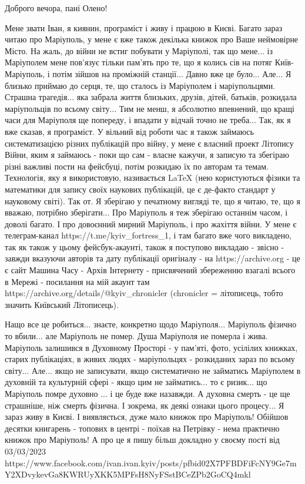  
 
 
 
 

Доброго вечора, пані Олено!

Мене звати Іван, я киянин, програміст і живу і працюю в Києві. Багато зараз
читаю про Маріуполь, у мене є вже також декілька книжок про Ваше неймовірне
Місто. На жаль, до війни не встиг побувати у Маріуполі, так що мене...  із
Маріуполем мене пов'язує тільки пам'ять про те, що я колись сів на потяг
Київ-Маріуполь, і потім зійшов на проміжній станції... Давно вже це було...
Але... Я близько приймаю до серця, те, що сталось із Маріуполем і
маріупольцями. Страшна трагедія... яка забрала життя близьких, друзів, дітей,
батьків, розкидала маріупольців по всьому світу...  Тим не менш, я абсолютно
впевнений, що кращі часи для Маріуполя ще попереду, і впадати у відчай точно не
треба...  Так, як я вже сказав, я програміст. У вільний від роботи час я також
займаюсь систематизацією різних публікацій про війну, у мене є власний проект
Літопису Війни, яким я займаюсь - поки що сам - власне кажучи, я записую та
збегіраю різні важливі пости на фейсбуці, потім розкидаю їх по авторам та
темам. Технологія, яку я використовую, називається LaTeX (нею користуються
фізики та математики для запису своїх наукових публікацій, це є де-факто
стандарт у науковому світі). Так от.  Я зберігаю у печатному вигляді те, що я
читаю, те, що я вважаю, потрібно зберігати...  Про Маріуполь я теж зберігаю
останнім часом, і доволі багато. І про довоєнний мирний Маріуполь, і про
жахіття війни. У мене є телеграм-канал https://t.me/kyiv_fortress_1, і там
багато вже чого викладено, так як також у цьому фейсбук-акаунті, також я
поступово викладаю - звісно - завжди вказуючи авторів та дату публікації
оригіналу - на https://archive.org - це є сайт Машина Часу - Архів Інтернету -
присвячений збереженню взагалі всього в Мережі - посилання на мій акаунт там
https://archive.org/details/@kyiv_chronicler (chronicler = літописець, тобто
значить Київський Літописець).

Нащо все це робиться... знаєте, конкретно щодо Маріуполя... Маріуполь фізично
то вбили...  але Маріуполь не помер. Душа Маріуполя не померла і жива.
Маріуполь залишився в Духовному Просторі - у пам'яті, фото, усілілих книжках,
старих публікаціях, в живих людях - маріупольцях - розкиданих зараз по всьому
світу...  Але... якщо не записувати, якщо систематично не займатись Маріуполем
в духовній та культурній сфері - якщо цим не займатись... то є ризик... що
Маріуполь помре духовно ...  і це буде вже назавжди. А духовна смерть - це ще
страшніше, ніж смерть фізична. І зокрема, як деякі ознаки цього процесу... Я
зараз живу в Києві. І виявляється, дуже мало книжок про Маріуполь!  Обійшов
десятки книгарень - топових в центрі - поїхав на Петрівку - нема практично
книжок про Маріуполь!  А про це я пишу більш докладно у своєму пості від 03/03/2023
https://www.facebook.com/ivan.ivan.kyiv/posts/pfbid02X7PFBDFiFcNY9Ge7mY2XDvykevGa8KWRUyXKK5MPFsH8NyFSstBCeZPb2GoCQ4mkl

